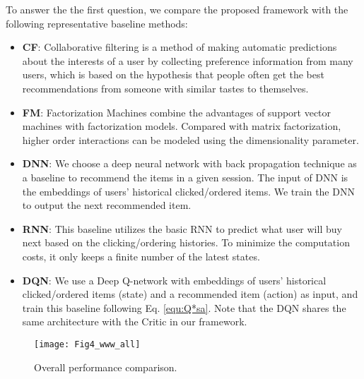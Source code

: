 To answer the the first question, we compare the proposed framework with the following representative baseline methods: 

\begin{itemize}[leftmargin=*]
	\item \textbf{CF}: Collaborative filtering\cite{breese1998empirical} is a method of making automatic predictions about the interests of a user by collecting preference information from many users, which is based on the hypothesis that people often get the best recommendations from someone with similar tastes to themselves. 
	\item \textbf{FM}: Factorization Machines\cite{rendle2010factorization} combine the advantages of support vector machines with factorization models. Compared with matrix factorization, higher order interactions can be modeled using the dimensionality parameter.
	\item \textbf{DNN}: We choose a deep neural network with back propagation technique as a baseline to recommend the items in a given session. The input of DNN is the embeddings of users' historical clicked/ordered items. We train the DNN to output the next recommended item.
	\item \textbf{RNN}: This baseline utilizes the basic RNN to predict what user will buy next based on the clicking/ordering histories. To minimize the computation costs, it only keeps a  finite number of the latest states.
    \item \textbf{DQN}: We use a Deep Q-network\cite{mnih2013playing} with embeddings of users' historical clicked/ordered items (state) and a recommended item (action) as input, and train this baseline following Eq. \ref{equ:Q*sa}. Note that the DQN shares the same architecture with the Critic in our framework. 
\end{itemize}

\begin{figure}[t]
	\centering
	\texttt{[image: Fig4\_www\_all]}
	\caption{Overall performance comparison.}
	\label{fig:overall}
	\vspace{-3mm}
\end{figure}

